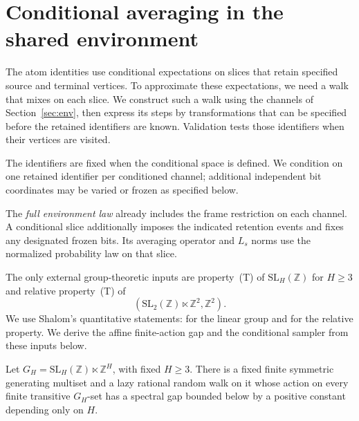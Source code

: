 \section{Conditional averaging in the shared environment}
\label{sec:averaging}

The atom identities use conditional expectations on slices that retain
specified source and terminal vertices.  To approximate these expectations,
we need a walk that mixes on each slice.  We construct such a walk using
the channels of Section~\ref{sec:env}, then express its steps by
transformations that can be specified before the retained identifiers
are known.  Validation tests those identifiers when their vertices are
visited.

The identifiers are fixed when the conditional space is defined.  We
condition on one retained identifier per conditioned channel; additional
independent bit coordinates may be varied or frozen as specified below.

The \emph{full environment law} already includes the frame restriction
on each channel.  A conditional slice additionally imposes the indicated
retention events and fixes any designated frozen bits.  Its averaging
operator and $L_s$ norms use the normalized probability law on that slice.

The only external group-theoretic inputs are property~(T) of
$\mathrm{SL}_H(\mathbb Z)$ for $H\ge3$ and relative property~(T) of
\[
(\mathrm{SL}_2(\mathbb Z)\ltimes\mathbb Z^2,\mathbb Z^2).
\]
We use Shalom's quantitative statements:
\cite[Theorem~2.6, p.~156]{Shalom1999} for the linear group and
\cite[Theorem~2.1, p.~152]{Shalom1999} for the relative property.
We derive the affine finite-action gap and the conditional sampler from
these inputs below.

\begin{lemma}\label{lem:env-affine}
Let
$G_H=\mathrm{SL}_H(\mathbb Z)\ltimes\mathbb Z^H$, with fixed
$H\ge3$. There is a fixed finite symmetric generating multiset and a
lazy rational random walk on it whose action on every finite transitive
$G_H$-set has a spectral gap bounded below by a positive constant
depending only on $H$.
\end{lemma}

